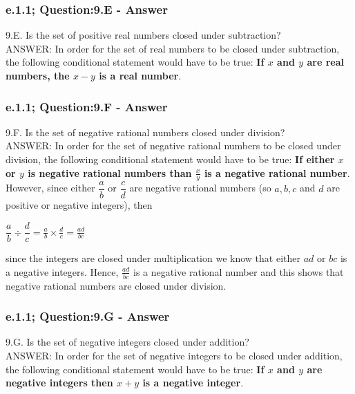 \subsubsection*{e.1.1; Question:9.E - Answer}
9.E. Is the set of positive real numbers closed under subtraction? \\

ANSWER: In order for the set of real numbers to be closed under subtraction, the following conditional statement would have to be true: {\bf If $x$ and $y$ are real numbers, the $x-y$ is a real number}. \\

\subsubsection*{e.1.1; Question:9.F - Answer}
9.F. Is the set of negative rational numbers closed under division? \\

ANSWER: In order for the set of negative rational numbers to be closed under division, the following conditional statement would have to be true: {\bf If either $x$ or $y$ is negative rational numbers than $\frac{x}{y}$ is a negative rational number}. However, since either $\dfrac{a}{b}$ or $\dfrac{c}{d}$ are negative rational numbers (so $a,b,c$ and $d$ are positive or negative integers), then \\

\begin{center}
$\dfrac{a}{b} \div \dfrac{d}{c} = \frac{a}{b} \times \frac{d}{c} = \frac{ad}{bc}$
\end{center}

since the integers are closed under multiplication we know that either $ad$ or $bc$ is a negative integers. Hence, $\frac{ad}{bc}$ is a negative rational number and this shows that negative rational numbers are closed under division. \\


\subsubsection*{e.1.1; Question:9.G - Answer}
9.G. Is the set of negative integers closed under addition? \\

ANSWER: In order for the set of negative integers to be closed under addition, the following conditional statement would have to be true: {\bf If $x$ and $y$ are negative integers then $x+y$ is a negative integer}.




